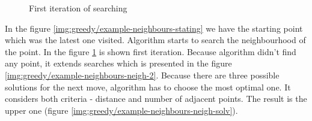 \documentclass[titlepage]{article}
\newcommand{\multifigcaption}{\captionsetup{justification=justified}}
\begin{document}
\begin{figure}[H]
\begin{center}
\begin{minipage}{.45\linewidth}
 			\multifigcaption
 			\caption{First iteration of searching \newline \newline \vspace{4mm}}
 			\label{img:greedy/example-neighbours-neigh-1} 
 		\end{minipage}
	\end{center}
\end{figure}

In the figure \ref{img:greedy/example-neighbours-stating} we have the starting point which was the latest one visited. Algorithm starts to search the neighbourhood of the point. In the figure \ref{img:greedy/example-neighbours-neigh-1} is shown first iteration. Because algorithm didn't find any point, it extends searches which is presented in the figure \ref{img:greedy/example-neighbours-neigh-2}. Because there are three possible solutions for the next move, algorithm has to choose the most optimal one. It considers both criteria - distance and number of adjacent points. The result is the upper one (figure \ref{img:greedy/example-neighbours-neigh-solv}).
\end{document}
